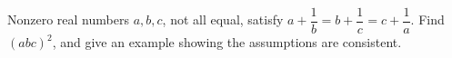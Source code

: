 Nonzero real numbers $a,b,c$, not all equal, satisfy $a+\dfrac{1}{b}=b+\dfrac{1}{c}=c+\dfrac{1}{a}$. Find $(abc)^2$, and give an example showing the assumptions are consistent.

